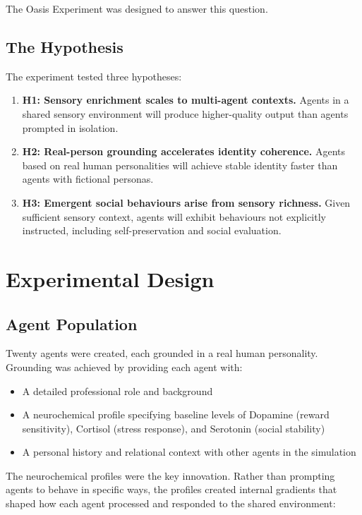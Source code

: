 \documentclass[11pt,a4paper]{article}
\begin{document}
The Oasis Experiment was designed to answer this question.

\subsection{The Hypothesis}

The experiment tested three hypotheses:

\begin{enumerate}
    \item \textbf{H1: Sensory enrichment scales to multi-agent contexts.} Agents in a shared sensory environment will produce higher-quality output than agents prompted in isolation.
    \item \textbf{H2: Real-person grounding accelerates identity coherence.} Agents based on real human personalities will achieve stable identity faster than agents with fictional personas.
    \item \textbf{H3: Emergent social behaviours arise from sensory richness.} Given sufficient sensory context, agents will exhibit behaviours not explicitly instructed, including self-preservation and social evaluation.
\end{enumerate}

\section{Experimental Design}

\subsection{Agent Population}

Twenty agents were created, each grounded in a real human personality. Grounding was achieved by providing each agent with:

\begin{itemize}
    \item A detailed professional role and background
    \item A neurochemical profile specifying baseline levels of Dopamine (reward sensitivity), Cortisol (stress response), and Serotonin (social stability)
    \item A personal history and relational context with other agents in the simulation
\end{itemize}

The neurochemical profiles were the key innovation. Rather than prompting agents to behave in specific ways, the profiles created internal gradients that shaped how each agent processed and responded to the shared environment:
\end{document}

